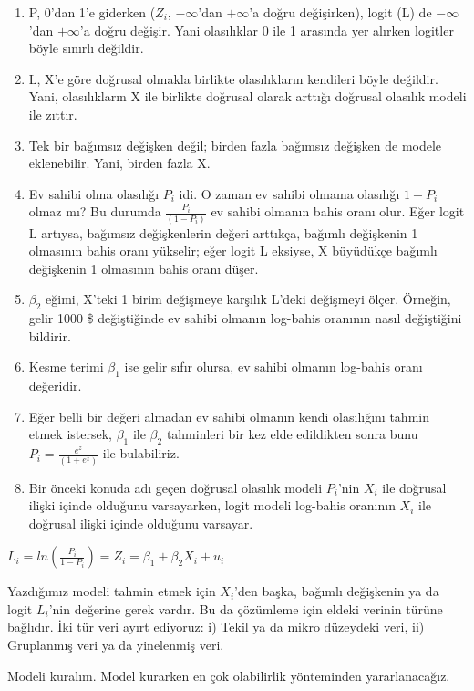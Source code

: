 \documentclass[
]{book}
\begin{document}
\begin{enumerate}
\def\labelenumi{\roman{enumi}.}
\item
  P, 0'dan 1'e giderken (\(Z_i\), \(-\infty\)'dan \(+\infty\)'a doğru değişirken), logit (L) de \(-\infty\)'dan \(+\infty\)'a doğru değişir. Yani olasılıklar 0 ile 1 arasında yer alırken logitler böyle sınırlı değildir.
\item
  L, X'e göre doğrusal olmakla birlikte olasılıkların kendileri böyle değildir. Yani, olasılıkların X ile birlikte doğrusal olarak arttığı doğrusal olasılık modeli ile zıttır.
\item
  Tek bir bağımsız değişken değil; birden fazla bağımsız değişken de modele eklenebilir. Yani, birden fazla X.
\item
  Ev sahibi olma olasılığı \(P_i\) idi. O zaman ev sahibi olmama olasılığı \(1-P_i\) olmaz mı? Bu durumda \(\frac{P_i}{(1-P_i)}\) ev sahibi olmanın bahis oranı olur. Eğer logit L artıysa, bağımsız değişkenlerin değeri arttıkça, bağımlı değişkenin 1 olmasının bahis oranı yükselir; eğer logit L eksiyse, X büyüdükçe bağımlı değişkenin 1 olmasının bahis oranı düşer.
\item
  \(\beta_2\) eğimi, X'teki 1 birim değişmeye karşılık L'deki değişmeyi ölçer. Örneğin, gelir 1000 \$ değiştiğinde ev sahibi olmanın log-bahis oranının nasıl değiştiğini bildirir.
\item
  Kesme terimi \(\beta_1\) ise gelir sıfır olursa, ev sahibi olmanın log-bahis oranı değeridir.
\item
  Eğer belli bir değeri almadan ev sahibi olmanın kendi olasılığını tahmin etmek istersek, \(\beta_1\) ile \(\beta_2\) tahminleri bir kez elde edildikten sonra bunu \(P_i = \frac{e^z}{(1 + e^z)}\) ile bulabiliriz.
\item
  Bir önceki konuda adı geçen doğrusal olasılık modeli \(P_i\)'nin \(X_i\) ile doğrusal ilişki içinde olduğunu varsayarken, logit modeli log-bahis oranının \(X_i\) ile doğrusal ilişki içinde olduğunu varsayar.
\end{enumerate}

\(L_i = ln(\frac{P_i}{1-P_i}) = Z_i = \beta_1 + \beta_2X_i + u_i\)

Yazdığımız modeli tahmin etmek için \(X_i\)'den başka, bağımlı değişkenin ya da logit \(L_i\)'nin değerine gerek vardır. Bu da çözümleme için eldeki verinin türüne bağlıdır. İki tür veri ayırt ediyoruz: i) Tekil ya da mikro düzeydeki veri, ii) Gruplanmış veri ya da yinelenmiş veri.

Modeli kuralım. Model kurarken en çok olabilirlik yönteminden yararlanacağız.
\end{document}

